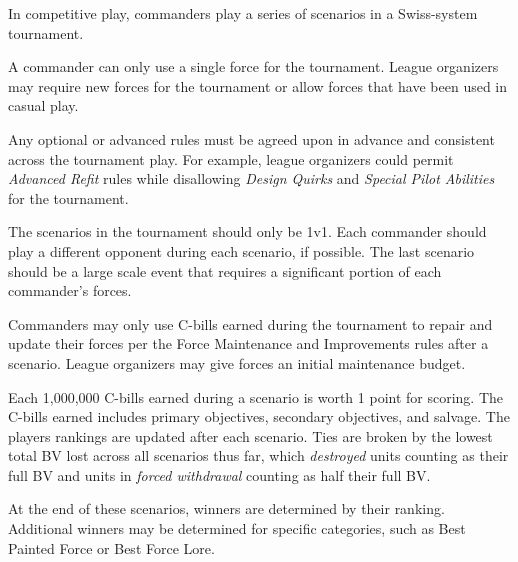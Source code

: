 In competitive play, commanders play a series of scenarios in a Swiss-system tournament.

A commander can only use a single force for the tournament.
League organizers may require new forces for the tournament or allow forces that have been used in casual play.

Any optional or advanced rules must be agreed upon in advance and consistent across the tournament play.
For example, league organizers could permit \emph{Advanced Refit} rules while disallowing \emph{Design Quirks} and \emph{Special Pilot Abilities} for the tournament.

The scenarios in the tournament should only be 1v1.
Each commander should play a different opponent during each scenario, if possible.
The last scenario should be a large scale event that requires a significant portion of each commander's forces.

Commanders may only use C-bills earned during the tournament to repair and update their forces per the Force Maintenance and Improvements rules after a scenario.
League organizers may give forces an initial maintenance budget.

Each 1,000,000 C-bills earned during a scenario is worth 1 point for scoring.
The C-bills earned includes primary objectives, secondary objectives, and salvage.
The players rankings are updated after each scenario.
Ties are broken by the lowest total BV lost across all scenarios thus far, which \emph{destroyed} units counting as their full BV and units in \emph{forced withdrawal} counting as half their full BV.

At the end of these scenarios, winners are determined by their ranking.
Additional winners may be determined for specific categories, such as Best Painted Force or Best Force Lore.

